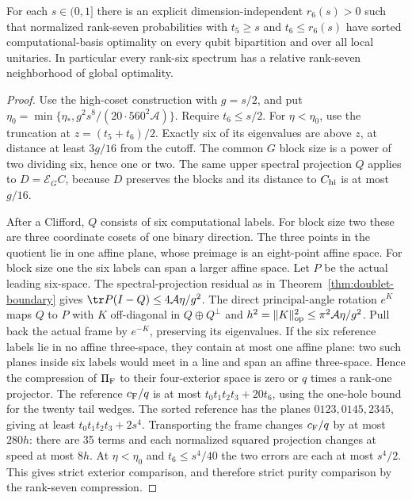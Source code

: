 \begin{theorem}\label{thm:all-rank6-boundary}
For each \(s\in(0,1]\) there is an explicit dimension-independent
\(r_6(s)>0\) such that normalized rank-seven probabilities with
\(t_5\ge s\) and \(t_6\le r_6(s)\) have sorted computational-basis
optimality on every qubit bipartition and over all local unitaries.
In particular every rank-six spectrum has a relative rank-seven
neighborhood of global optimality.
\end{theorem}

\begin{proof}
Use the high-coset construction with \(g=s/2\), and put
\(\eta_0=\min\{\eta_*,g^2s^8/(20\cdot560^2\mathcal A)\}\).
Require \(t_6\le s/2\). For \(\eta<\eta_0\), use the truncation at
\(z=(t_5+t_6)/2\). Exactly six of its eigenvalues are above \(z\),
at distance at least \(3g/16\) from the cutoff. The common \(G\)
block size is a power of two dividing six, hence one or two.
The same upper spectral projection \(Q\) applies to
\(D=\mathcal E_G C\), because \(D\) preserves the blocks and its
distance to \(C_{\rm hi}\) is at most \(g/16\).

After a Clifford, \(Q\) consists of six computational labels.
For block size two these are three coordinate cosets of one
binary direction. The three points in the quotient lie in one
affine plane, whose preimage is an eight-point affine space.
For block size one the six labels can span a larger affine space.
Let \(P\) be the actual leading six-space.
The spectral-projection residual as in
Theorem~\ref{thm:doublet-boundary} gives
\(\tr P(I-Q)\le4\mathcal A\eta/g^2\).
The direct principal-angle rotation \(e^K\) maps \(Q\) to \(P\)
with \(K\) off-diagonal in \(Q\oplus Q^\perp\) and
\(h^2=\|K\|_{\rm op}^2\le \pi^2\mathcal A\eta/g^2\).
Pull back the actual frame by \(e^{-K}\), preserving its
eigenvalues. If the six reference labels lie in no affine
three-space, they contain at most one affine plane: two such
planes inside six labels would meet in a line and span an affine
three-space. Hence the compression of \(\Pi_{\rm F}\) to their
four-exterior space is zero or \(q\) times a rank-one projector.
The reference \(c_{\rm F}/q\) is at most \(t_0t_1t_2t_3+20t_6\),
using the one-hole bound for the twenty tail wedges. The sorted
reference has the planes \(0123,0145,2345\), giving at least
\(t_0t_1t_2t_3+2s^4\). Transporting the frame changes
\(c_{\rm F}/q\) by at most \(280h\): there are 35 terms and each
normalized squared projection changes at speed at most \(8h\).
At \(\eta<\eta_0\) and \(t_6\le s^4/40\) the two errors are each
at most \(s^4/2\). This gives strict exterior comparison, and
therefore strict purity comparison by the rank-seven compression.


\end{proof}
